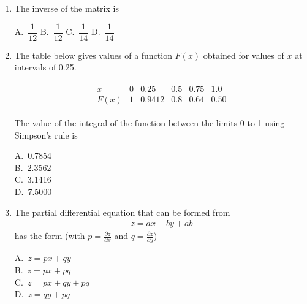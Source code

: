 \documentclass[journal,12pt,onecolumn]{exam}
\theoremstyle{remark}
\begin{document}
\begin{enumerate}
\item The inverse of the matrix  is
\hfill{}\newline

\begin{multicols}{2}
A.\ $\dfrac{1}{12}$
B.\ $\dfrac{1}{12}$
C.\ $\dfrac{1}{14}$
D.\ $\dfrac{1}{14}$
\end{multicols}

\noindent\item The table below gives values of a function $F(x)$ obtained for values of $x$ at intervals of 0.25.

\begin{align*}
\begin{array}{c|c|c|c|c|c}
x & 0 & 0.25 & 0.5 & 0.75 & 1.0 \\
\hline
F(x) & 1 & 0.9412 & 0.8 & 0.64 & 0.50
\end{array}
\end{align*}

The value of the integral of the function between the limits 0 to 1 using Simpson's rule is
\\ \hfill{}
\begin{multicols}{4}
A.\ 0.7854 \\
B.\ 2.3562 \\
C.\ 3.1416 \\
D.\ 7.5000
\end{multicols}



\noindent\item The partial differential equation that can be formed from 
\begin{align*}
z = ax + by + ab
\end{align*}
has the form (with $p = \frac{\partial z}{\partial x}$ and $q = \frac{\partial z}{\partial y}$)
\hfill{}
\begin{multicols}{4}
A.\ $z = px + qy$ \\
B.\ $z = px + pq$ \\
C.\ $z = px + qy + pq$ \\
D.\ $z = qy + pq$
\end{multicols}


\end{enumerate}
\end{document}
